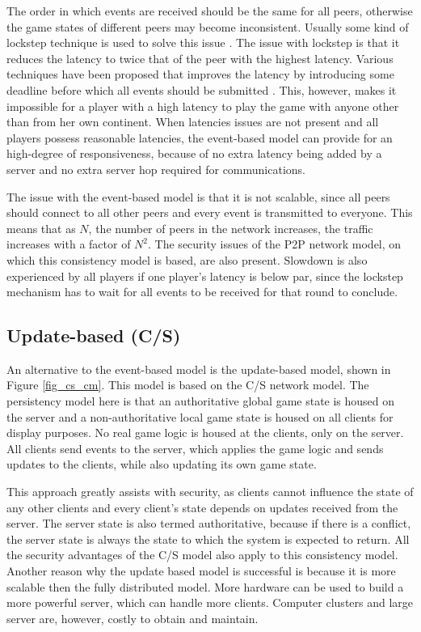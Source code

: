 \documentclass[10pt,a4paper,journal,cspaper,compsoc]{IEEEtran}
\begin{document}
The order in which events are received should be the same for all peers, otherwise the game states of different peers may become inconsistent.
Usually some kind of lockstep technique is used to solve this issue \cite{pessimistic_lock_step}. The issue with lockstep is that it reduces the
latency to twice that of the peer with the highest latency. Various techniques have been proposed that improves the latency by introducing some
deadline before which all events should be submitted \cite{cheat_proof_event_ordering}. This, however, makes it impossible for a player with a high
latency to play the game with anyone other than from her own continent. When latencies issues are not present and all players possess reasonable
latencies, the event-based model can provide for an high-degree of responsiveness, because of no extra latency being added by a server and no extra
server hop required for communications.

The issue with the event-based model is that it is not scalable, since all peers should connect to all other peers and every event is transmitted to
everyone. This means that as $N$, the number of peers in the network increases, the traffic increases with a factor of $N^2$. The security issues of
the P2P network model, on which this consistency model is based, are also present. Slowdown is also experienced by all players if one player's
latency is below par, since the lockstep mechanism has to wait for all events to be received for that round to conclude.

\subsection{Update-based (C/S)}

An alternative to the event-based model is the update-based model, shown in Figure \ref{fig_cs_cm}. This model is based on the C/S network model. The
persistency model here is that an authoritative global game state is housed on the server and a non-authoritative local game state is housed on all
clients for display purposes. No real game logic is housed at the clients, only on the server. All clients send events to the server, which applies
the game logic and sends updates to the clients, while also updating its own game state.

This approach greatly assists with security, as clients cannot influence the state of any other clients and every client's state depends on updates
received from the server. The server state is also termed authoritative, because if there is a conflict, the server state is always the state to
which the system is expected to return. All the security advantages of the C/S model also apply to this consistency model. Another reason why the
update based model is successful is because it is more scalable then the fully distributed model. More hardware can be used to build a more powerful
server, which can handle more clients. Computer clusters and large server are, however, costly to obtain and maintain.
\end{document}
